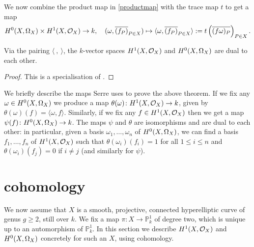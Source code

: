 We now combine the product map in \eqref{productmap} with the trace map $t$ to get a map 
    \[
     {H^0(X,\Omega_X)} \times H^1(X,\mathcal{O}_X) \rightarrow k,\quad (\omega, \overline{(f_P)}_{P \in X}) \mapsto \langle \omega, \overline{(f_P)}_{P \in X} \rangle := t \left( \overline{(f \omega)_P} \right)_{P \in X}.
    \]

    \begin{thm}\label{serredualitytheorem}
    Via the pairing $\langle\ ,\ \rangle$, the $k$-vector spaces $H^1(X,\mathcal{O}_X)$ and ${H^0(X,\Omega_X)}$ are dual to each other.
    \end{thm}
    \begin{proof}
    This is a specialisation of \cite[Chap. II, Thm. 2]{algebraicgroupsandclassfields}.
    \end{proof}

We briefly describe the maps Serre uses to prove the above theorem.
If we fix any $\omega \in {H^0(X,\Omega_X)}$ we produce a map $\theta(\omega)\colon H^1(X,\mathcal{O}_X) \rightarrow k$, given by $\theta(\omega)(f) = \langle \omega , f\rangle$.
Similarly, if we fix any $f \in H^1(X,\mathcal{O}_X)$ then we get a map $\psi(f) \colon {H^0(X,\Omega_X)} \rightarrow k$.
The maps $\psi$ and $\theta$ are isomorphisms and are dual to each other: in particular, given a basis $\omega_1, \ldots, \omega_n$ of ${H^0(X,\Omega_X)}$, we can find a basis $f_1, \ldots , f_n$ of $H^1(X,\mathcal{O}_X)$ such that $\theta(\omega_i)(f_i) = 1$ for all $1 \leq i \leq n$ and $\theta(\omega_i)(f_j) = 0$ if $i \neq j$ (and similarly for $\psi$).


\section{\cech cohomology}

We now assume that $X$ is a smooth, projective, connected hyperelliptic curve of genus $g \geq 2$, still over $k$.
We  fix a map $\pi \colon X \rightarrow \mathbb P_k^1$ of degree two, which is unique up to an automorphism of $\mathbb P_k^1$.
In this section we describe $H^1(X,\mathcal{O}_X)$ and ${H^0(X,\Omega_X)}$ concretely for such an $X$, using \cech cohomology.

